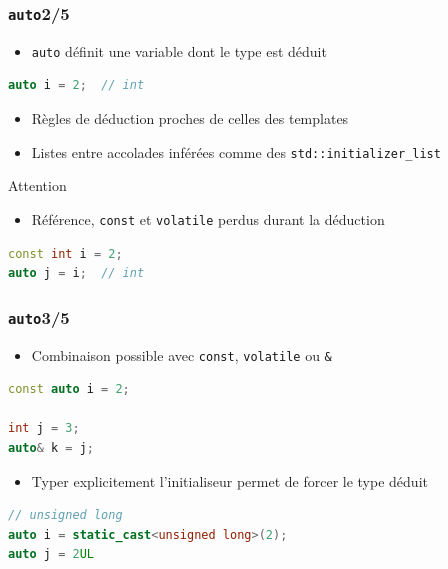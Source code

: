 \documentclass[C++.tex]{subfiles}
\begin{document}
\begin{frame}[fragile]
	\frametitle{\lstinline|auto|\titlehfill{}2/5}
	\begin{itemize}
		\item \lstinline|auto| définit une variable dont le type est déduit
	\end{itemize}

	\begin{lstlisting}[language=C++]
auto i = 2;  // int\end{lstlisting}

	\begin{itemize}
		\item Règles de déduction proches de celles des templates
		\item Listes entre accolades inférées comme des \lstinline|std::initializer_list|
	\end{itemize}

	\begin{alertblock}{Attention}
		\begin{itemize}
			\item Référence, \lstinline|const| et \lstinline|volatile| perdus durant la déduction
		\end{itemize}

		\begin{lstlisting}[language=C++]
const int i = 2;
auto j = i;  // int \end{lstlisting}
	\end{alertblock}
\end{frame}

\begin{frame}[fragile]
	\frametitle{\lstinline|auto|\titlehfill{}3/5}
	\begin{itemize}
		\item Combinaison possible avec \lstinline|const|, \lstinline|volatile| ou \lstinline|&|
	\end{itemize}

	\begin{lstlisting}[language=C++]
const auto i = 2;

int j = 3;
auto& k = j;\end{lstlisting}

	\begin{itemize}
		\item Typer explicitement l'initialiseur permet de forcer le type déduit
	\end{itemize}

	\begin{lstlisting}[language=C++]
// unsigned long
auto i = static_cast<unsigned long>(2);
auto j = 2UL\end{lstlisting}
\end{frame}
\end{document}
